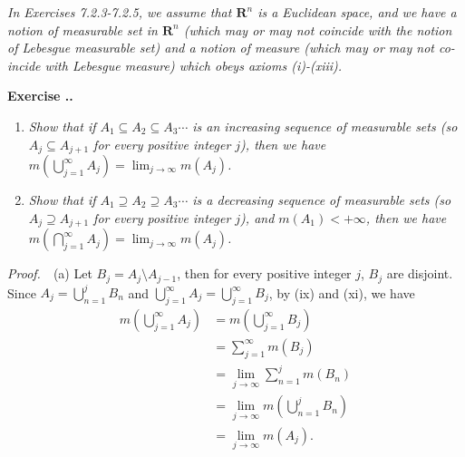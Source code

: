 \documentclass{book}
\newcommand{\pff}{\vspace{.25em}\noindent\emph{Proof.}~~}
\newcounter{Exercise}[section]
\renewcommand{\theExercise}{\thesection.\arabic{Exercise}.}
\newcommand{\new}{\vspace{1.5em}\noindent\textbf{Exercise \stepcounter{Exercise}\textbf{\theExercise}} }
\begin{document}
\begin{comment}
\pff Suppose that $m^*(A)$ and $m^*(B)$ are finite. Let $\varepsilon>0$, then there is $A \subseteq \bigcup_{i \in I} A_i$ and $B \subseteq \bigcup_{j \in J} B_j$ such that
    \begin{align*}
        m^*(A)
        \leq m^*\left(\bigcup_{i \in I} A_i\right)
        \leq \sum_{i \in I} m^*(A_i)
    \end{align*}
and
    \begin{align*}
        m^*(B)
        \leq m^*\left(\bigcup_{j \in J} B_j\right)
        \leq \sum_{j \in J} m^*(B_j).
    \end{align*}
Given $x \in A$, then there is $i \in I$ such that $A \subseteq A_i$. Thus we have
    \begin{align*}
        m^*(A\times B)
        \leq m^*\left(\bigcup_{j \in J}(A_i \times B_j)\right)
        \leq \sum_{j \in J} m^*(A_i \times B_j)
    \end{align*}
\end{comment}
\vspace{1.5em}

\emph{In Exercises 7.2.3-7.2.5, we assume that $\mathbf{R}^n$ is a Euclidean space, and we have a notion of measurable set in $\mathbf{R}^n$ (which may or may not coincide with the notion of Lebesgue measurable set) and a notion of measure (which may or may not co-incide with Lebesgue measure) which obeys axioms (i)-(xiii).}

\new
\begin{enumerate}
    \item \emph{Show that if $A_1 \subseteq A_2 \subseteq A_3 \cdots$ is an increasing sequence of measurable sets (so $A_j \subseteq A_{j+1}$ for every positive integer $j$), then we have $m(\bigcup_{j=1}^{\infty} A_j) = \lim_{j \to \infty} m(A_j)$.}
    \item \emph{Show that if $A_1 \supseteq A_2 \supseteq A_3 \cdots$ is a decreasing sequence of measurable sets (so $A_j \supseteq A_{j+1}$ for every positive integer $j$), and $m(A_1) < +\infty$, then we have $m(\bigcap_{j=1}^{\infty} A_j) = \lim_{j \to \infty} m(A_j)$.}
\end{enumerate}

\pff (a) Let $B_j = A_j \setminus A_{j-1}$, then for every positive integer $j$, $B_j$ are disjoint. Since $A_j = \bigcup_{n = 1}^{j} B_n$ and $\bigcup_{j = 1}^{\infty} A_j = \bigcup_{j = 1}^{\infty} B_j$, by (ix) and (xi), we have
    \begin{align*}
        m\left( \bigcup_{j = 1}^{\infty} A_j \right)
        &= m\left( \bigcup_{j = 1}^{\infty} B_j \right)\\
        &= \sum_{j = 1}^{\infty} m(B_j)\\
        &= \lim_{j \to \infty} \sum_{n = 1}^{j} m(B_n)\\
        &= \lim_{j \to \infty} m\left( \bigcup_{n = 1}^{j} B_n \right)\\
        &= \lim_{j \to \infty} m(A_j).
    \end{align*}
\end{document}
